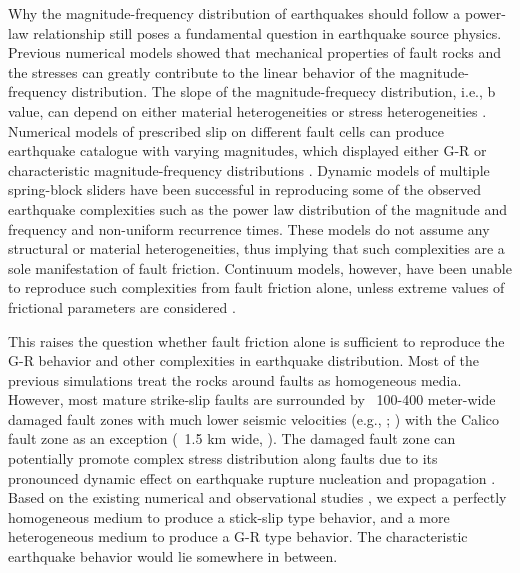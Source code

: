 \documentclass[11pt]{article}
\begin{document}
Why the magnitude-frequency distribution of earthquakes should follow a power-law relationship still poses a fundamental question in earthquake source physics. Previous numerical models \citep{rundle_jackson_1977, rundle_1989} showed that mechanical properties of fault rocks and the stresses can greatly contribute to the linear behavior of the magnitude-frequency distribution. The slope of the magnitude-frequecy distribution, i.e., b value, can depend on either material heterogeneities \citep{mogi_1962} or stress heterogeneities \citep{scholz_1968}. Numerical models of prescribed slip on different fault cells can produce earthquake catalogue with varying magnitudes, which displayed either G-R or characteristic magnitude-frequency distributions \citep{benzion_rice_1995}. Dynamic models of multiple spring-block sliders \citep{carlson_langer_1989, shaw_1995} have been successful in reproducing some of the observed earthquake complexities such as the power law distribution of the magnitude and frequency and non-uniform recurrence times. These models do not assume any structural or material heterogeneities, thus implying that such complexities are a sole manifestation of fault friction. Continuum models, however, have been unable to reproduce such complexities from fault friction alone, unless extreme values of frictional parameters are considered \citep{cochard_madariaga_1996, hillers_2006}.

This raises the question whether fault friction alone is sufficient to reproduce the G-R behavior and other complexities in earthquake distribution. Most of the previous simulations treat the rocks around faults as homogeneous media. However, most mature strike-slip faults are surrounded by ~100-400 meter-wide damaged fault zones with much lower seismic velocities (e.g., \citealp{benzion_sammis_2003}; \citealp[table 1]{huang_2014}) with the Calico fault zone as an exception (~1.5 km wide, \citealp{cochran_2009}). The damaged fault zone can potentially promote complex stress distribution along faults due to its pronounced dynamic effect on earthquake rupture nucleation and propagation \citep{harris_day_1997,huang_ampuero_2011, huang_2014, ma_elbanna_2015, albertini_kammer_2017, weng_2016, huang_2018}. Based on the existing numerical and observational studies \citep{wesnousky_1994, hillers_2006, aochi_ide_2009}, we expect a perfectly homogeneous medium to produce a stick-slip type behavior, and a more heterogeneous medium to produce a G-R type behavior. The characteristic earthquake behavior would lie somewhere in between.
\end{document}
